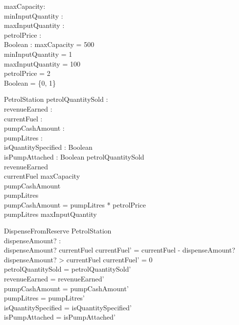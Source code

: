 

\begin{axdef}
maxCapacity: \nat \\
minInputQuantity : \nat \\
maxInputQuantity : \nat \\
petrolPrice : \nat \\
Boolean : \power \nat
\where
maxCapacity = 500 \\
minInputQuantity = 1 \\
maxInputQuantity = 100 \\
petrolPrice = 2 \\
Boolean = \{0, 1\}
\end{axdef}

\begin{schema}{PetrolStation}
petrolQuantitySold : \nat \\
revenueEarned : \nat \\
currentFuel : \nat \\
pumpCashAmount : \nat \\
pumpLitres : \nat \\
isQuantitySpecified : Boolean \\
isPumpAttached : Boolean
\where
petrolQuantitySold  \\
revenueEarned  \\
currentFuel \leq maxCapacity \\
pumpCashAmount  \\
pumpLitres  \\
pumpCashAmount = pumpLitres * petrolPrice \\
pumpLitres \leq maxInputQuantity
\end{schema}

\begin{schema}{DispenseFromReserve}
\Delta PetrolStation \\
dispenseAmount? : \nat \\
\where
dispenseAmount? \leq currentFuel \implies currentFuel' = currentFuel - dispenseAmount? \\
dispenseAmount? > currentFuel \implies currentFuel' = 0 \\
petrolQuantitySold = petrolQuantitySold' \\
revenueEarned = revenueEarned' \\
pumpCashAmount = pumpCashAmount' \\
pumpLitres = pumpLitres' \\
isQuantitySpecified = isQuantitySpecified' \\
isPumpAttached = isPumpAttached' \\
\end{schema}

